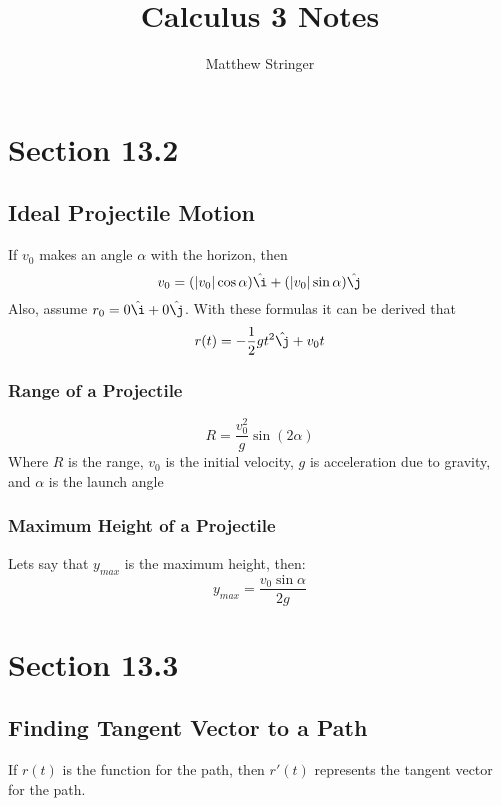 \documentclass[12pt]{article}
\title{Calculus 3 Notes} %
\date{}
\author{Matthew Stringer} %
\theoremstyle{break}
\numberwithin{theorem}{subsection}
\numberwithin{lemma}{subsection}
\numberwithin{corollary}{subsection}
\numberwithin{equation}{subsection}
\begin{document}
\maketitle
\tableofcontents
\newpage

\section{Section 13.2}

\subsection{Ideal Projectile Motion}
If $v_0$ makes an angle $\alpha$ with the horizon, then 
\begin{equation*}
v_0 = (|v_0|\cos \alpha){\hat \i} + (|v_0|\sin \alpha){\hat \j}
\end{equation*}
Also, assume $r_0 = 0{\hat \i} + 0{\hat \j}$. With these formulas it can be derived that
\begin{equation*}
r(t) = -\frac12 gt^2 {\hat \j} + v_0t
\end{equation*}

\subsubsection{Range of a Projectile}
\begin{equation*}
R = \frac{v_0^2}{g} \sin (2\alpha)
\end{equation*}
Where $R$ is the range, $v_0$ is the initial velocity, $g$ is acceleration due to gravity, and 
$\alpha$ is the launch angle

\subsubsection{Maximum Height of a Projectile}
Lets say that $y_{max}$ is the maximum height, then:
\begin{equation*}
	y_{max} = \frac{v_0 \sin \alpha}{2g}
\end{equation*}

\section{Section 13.3}

\subsection{Finding Tangent Vector to a Path}
If $r(t)$ is the function for the path, then $r'(t)$ represents the tangent vector for the path.
\end{document}
